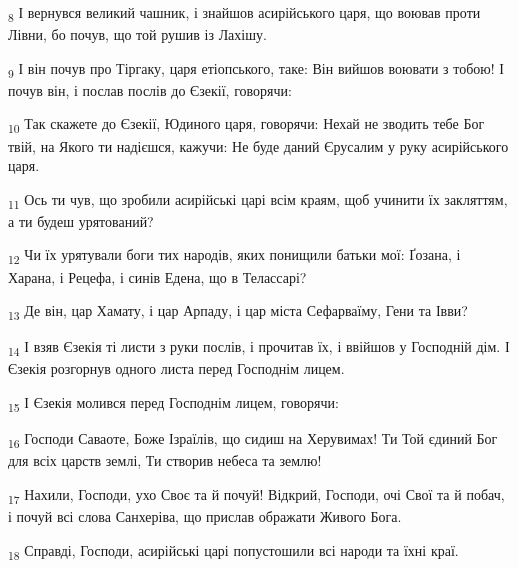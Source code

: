 \begin{tcolorbox}
\textsubscript{8} І вернувся великий чашник, і знайшов асирійського царя, що воював проти Лівни, бо почув, що той рушив із Лахішу.
\end{tcolorbox}
\begin{tcolorbox}
\textsubscript{9} І він почув про Тіргаку, царя етіопського, таке: Він вийшов воювати з тобою! І почув він, і послав послів до Єзекії, говорячи:
\end{tcolorbox}
\begin{tcolorbox}
\textsubscript{10} Так скажете до Єзекії, Юдиного царя, говорячи: Нехай не зводить тебе Бог твій, на Якого ти надієшся, кажучи: Не буде даний Єрусалим у руку асирійського царя.
\end{tcolorbox}
\begin{tcolorbox}
\textsubscript{11} Ось ти чув, що зробили асирійські царі всім краям, щоб учинити їх закляттям, а ти будеш урятований?
\end{tcolorbox}
\begin{tcolorbox}
\textsubscript{12} Чи їх урятували боги тих народів, яких понищили батьки мої: Ґозана, і Харана, і Рецефа, і синів Едена, що в Телассарі?
\end{tcolorbox}
\begin{tcolorbox}
\textsubscript{13} Де він, цар Хамату, і цар Арпаду, і цар міста Сефарваїму, Гени та Івви?
\end{tcolorbox}
\begin{tcolorbox}
\textsubscript{14} І взяв Єзекія ті листи з руки послів, і прочитав їх, і ввійшов у Господній дім. І Єзекія розгорнув одного листа перед Господнім лицем.
\end{tcolorbox}
\begin{tcolorbox}
\textsubscript{15} І Єзекія молився перед Господнім лицем, говорячи:
\end{tcolorbox}
\begin{tcolorbox}
\textsubscript{16} Господи Саваоте, Боже Ізраїлів, що сидиш на Херувимах! Ти Той єдиний Бог для всіх царств землі, Ти створив небеса та землю!
\end{tcolorbox}
\begin{tcolorbox}
\textsubscript{17} Нахили, Господи, ухо Своє та й почуй! Відкрий, Господи, очі Свої та й побач, і почуй всі слова Санхеріва, що прислав ображати Живого Бога.
\end{tcolorbox}
\begin{tcolorbox}
\textsubscript{18} Справді, Господи, асирійські царі попустошили всі народи та їхні краї.
\end{tcolorbox}

